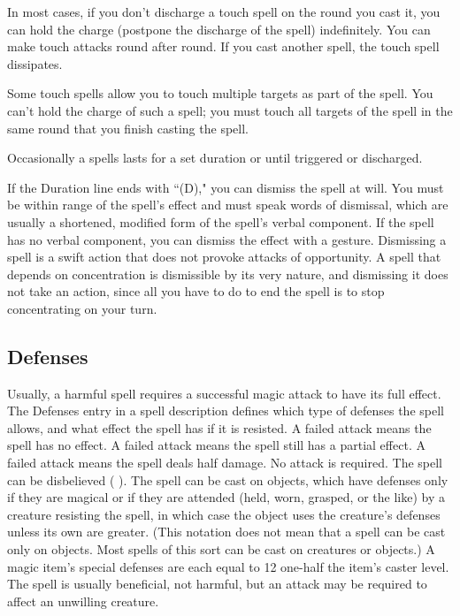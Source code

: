  In most cases, if you don't discharge a touch spell on the round you cast it, you can hold the charge (postpone the discharge of the spell) indefinitely. You can make touch attacks round after round. If you cast another spell, the touch spell dissipates.

Some touch spells allow you to touch multiple targets as part of the spell. You can't hold the charge of such a spell; you must touch all targets of the spell in the same round that you finish casting the spell.

 Occasionally a spells lasts for a set duration or until triggered or discharged.

 If the Duration line ends with ``(D)," you can dismiss the spell at will. You must be within range of the spell's effect and must speak words of dismissal, which are usually a shortened, modified form of the spell's verbal component. If the spell has no verbal component, you can dismiss the effect with a gesture. Dismissing a spell is a swift action that does not provoke attacks of opportunity. A spell that depends on concentration is dismissible by its very nature, and dismissing it does not take an action, since all you have to do to end the spell is to stop concentrating on your turn.

\subsection{Defenses}\label{Magic Defenses}
Usually, a harmful spell requires a successful magic attack to have its full effect. The Defenses entry in a spell description defines which type of defenses the spell allows, and what effect the spell has if it is resisted.
 A failed attack means the spell has no effect.
 A failed attack means the spell still has a partial effect.
 A failed attack means the spell deals half damage.
 No attack is required.
 The spell can be disbelieved ( ).
 The spell can be cast on objects, which have defenses only if they are magical or if they are attended (held, worn, grasped, or the like) by a creature resisting the spell, in which case the object uses the creature's defenses unless its own are greater. (This notation does not mean that a spell can be cast only on objects. Most spells of this sort can be cast on creatures or objects.) A magic item's special defenses are each equal to 12 \add one-half the item's caster level.
 The spell is usually beneficial, not harmful, but an attack may be required to affect an unwilling creature.

